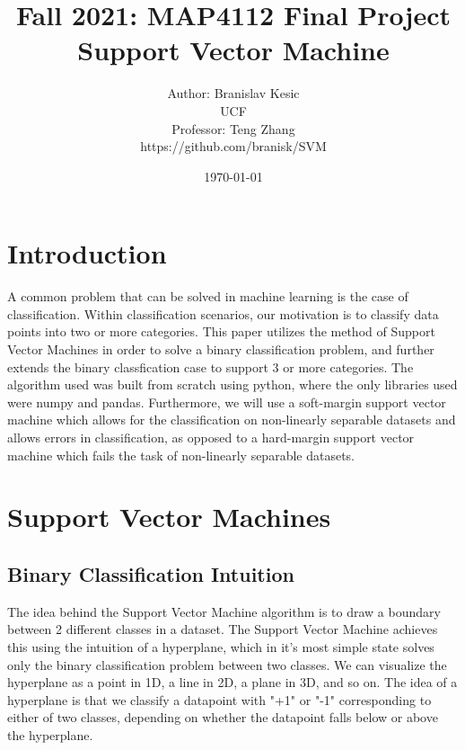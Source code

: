 \documentclass[12pt]{article}%
\begin{document}
	
	\title{Fall 2021: MAP4112 Final Project\\Support Vector Machine}
	\author{Author: Branislav Kesic\\UCF\\Professor: Teng Zhang\\
		https://github.com/branisk/SVM
	}
	\date{\today}
	\maketitle
	
	\section{Introduction}
	A common problem that can be solved in machine learning is the case of classification.  Within classification scenarios, our motivation is to classify data points into two or more categories.  This paper utilizes the method of Support Vector Machines in order to solve a binary classification problem, and further extends the binary classfication case to support 3 or more categories.  The algorithm used was built from scratch using python, where the only libraries used were numpy and pandas.  Furthermore, we will use a soft-margin support vector machine which allows for the classification on non-linearly separable datasets and allows errors in classification, as opposed to a hard-margin support vector machine which fails the task of non-linearly separable datasets.
	
	\section{Support Vector Machines}
	
	\subsection{Binary Classification Intuition}
	The idea behind the Support Vector Machine algorithm is to draw a boundary between 2 different classes in a dataset.  The Support Vector Machine achieves this using the intuition of a hyperplane, which in it's most simple state solves only the binary classification problem between two classes.  We can visualize the hyperplane as a point in 1D, a line in 2D, a plane in 3D, and so on.  The idea of a hyperplane is that we classify a datapoint with "+1" or "-1" corresponding to either of two classes, depending on whether the datapoint falls below or above the hyperplane.  
	
\end{document}
